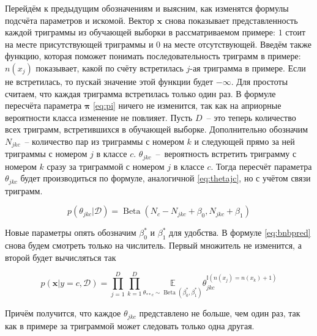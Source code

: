 Перейдём к предыдущим обозначениям и выясним, как изменятся формулы подсчёта параметров и
искомой. Вектор $\mathbf{x}$ снова показывает представленность каждой триграммы из обучающей
выборки в рассматриваемом примере: $1$ стоит на месте присутствующей триграммы и $0$ на месте
отсутствующей. Введём также функцию, которая поможет понимать последовательность триграмм в примере:
$n(x_{j})$ показывает, какой по счёту встретилась $j$-ая триграмма в примере. Если не встретилась,
то пускай значение этой функции будет $-\infty$. Для простоты считаем,
что каждая триграмма встретилась только один раз. В формуле пересчёта параметра $\mathbf{\pi}$ \ref{eq:pi} ничего не изменится, так как
на априорные вероятности класса изменение не повлияет. Пусть $D$~-- это теперь количество всех
триграмм, встретившихся в обучающей выборке. Дополнительно обозначим $N_{jkc}$~--
количество пар из триграммы с номером $k$ и следующей прямо за ней триграммы с номером $j$ в классе $c$.
$\theta_{jkc}$~--~вероятность встретить триграмму с номером $k$ сразу за триграммой с номером $j$ в
классе $c$. Тогда пересчёт параметра $\theta_{jkc}$ будет производиться по формуле, аналогичной
\ref{eq:thetajc}, но с учётом связи триграмм.

\begin{equation}
  p(\theta_{jkc}|\mathcal{D}) = \operatorname{Beta}(N_c-N_{jkc}+\beta_0, N_{jkc}+\beta_1)
  \label{eq:thetajkc}
\end{equation}

Новые параметры опять обозначим $\beta_0^*$ и $\beta_1^*$ для удобства. В формуле \ref{eq:bnbpred} снова будем смотреть только на числитель. Первый множитель не изменится,
а второй будет вычисляться так

\begin{equation}
   p(\mathbf{x}|y=c,\mathcal{D}) =
   \prod_{j=1}^D\prod_{k=1}^D\underset{\theta_{**c}\sim\operatorname{Beta}(\beta_0^*,\beta_1^*)}{\mathbb{E}}\theta_{jkc}^{\mathbb{I}(n(x_{j})=n(x_{k})+1)}
   \label{eq:maththetagr}
\end{equation}

Причём получится, что каждое $\theta_{jkc}$ представлено не больше, чем один раз, так как в примере
за триграммой может следовать только одна другая.
